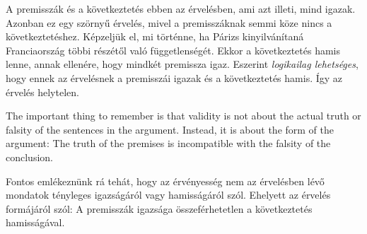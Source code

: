A premisszák és a következtetés ebben az érvelésben, ami azt illeti, mind igazak. Azonban ez egy szörnyű érvelés, mivel a premisszáknak semmi köze nincs a következtetéshez. Képzeljük el, mi történne, ha Párizs kinyilvánítaná Franciaország többi részétől való függetlenségét. Ekkor a következtetés hamis lenne, annak ellenére, hogy mindkét premissza igaz. Eszerint \emph{logikailag lehetséges}, hogy ennek az érvelésnek a premisszái igazak és a következtetés hamis. Így az érvelés helytelen.

The important thing to remember is that validity is not about the actual truth or falsity of the sentences in the argument. Instead, it is about the form of the argument: The truth of the premises is incompatible with the falsity of the conclusion.

Fontos emlékeznünk rá tehát, hogy az érvényesség nem az érvelésben lévő mondatok tényleges igazságáról vagy hamisságáról szól. Ehelyett az érvelés formájáról szól: A premisszák igazsága összeférhetetlen a következtetés hamisságával.









